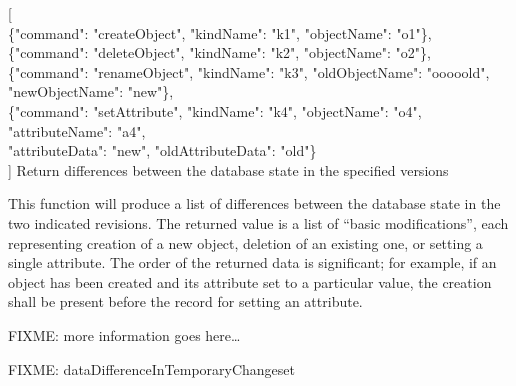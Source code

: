 \documentclass{article}
\begin{document}
    {[ \\
    \{"command": "createObject", "kindName": "k1", "objectName": "o1"\}, \\
    \{"command": "deleteObject", "kindName": "k2", "objectName": "o2"\}, \\
    \{"command": "renameObject", "kindName": "k3", "oldObjectName": "ooooold", "newObjectName": "new"\}, \\
    \{"command": "setAttribute", "kindName": "k4", "objectName": "o4", "attributeName": "a4", \\
        "attributeData": "new", "oldAttributeData": "old"\} \\
    ]}
    {Return differences between the database state in the specified versions}
    {This function will produce a list of differences between the database state in the two indicated revisions.  The
    returned value is a list of ``basic modifications'', each representing creation of a new object, deletion of an
    existing one, or setting a single attribute.  The order of the returned data is significant; for example, if an
    object has been created and its attribute set to a particular value, the creation shall be present before the record
    for setting an attribute.

    FIXME: more information goes here\ldots}

FIXME: dataDifferenceInTemporaryChangeset
\end{document}
